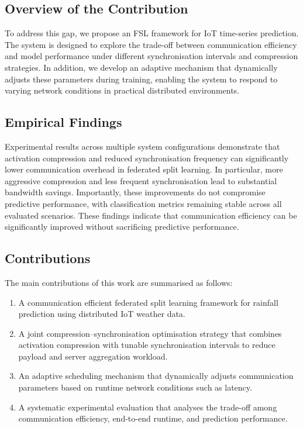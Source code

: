 \documentclass[conference]{IEEEtran}
\begin{document}
\subsection{Overview of the Contribution}
To address this gap, we propose an FSL framework for IoT time-series prediction. The system is designed to explore the trade-off between communication efficiency and model performance under different synchronisation intervals and compression strategies. In addition, we develop an adaptive mechanism that dynamically adjusts these parameters during training, enabling the system to respond to varying network conditions in practical distributed environments.


\subsection{Empirical Findings}

Experimental results across multiple system configurations demonstrate that activation compression and reduced synchronisation frequency can significantly lower communication overhead in federated split learning. In particular, more aggressive compression and less frequent synchronisation lead to substantial bandwidth savings. Importantly, these improvements do not compromise predictive performance, with classification metrics remaining stable across all evaluated scenarios. These findings indicate that communication efficiency can be significantly improved without sacrificing predictive performance.


\subsection{Contributions}
The main contributions of this work are summarised as follows:
\begin{enumerate}
    \item A communication efficient federated split learning framework for rainfall prediction using distributed IoT weather data.
    \item A joint compression--synchronisation optimisation strategy that combines activation compression with tunable synchronisation intervals to reduce payload and server aggregation workload.
    \item An adaptive scheduling mechanism that dynamically adjusts communication parameters based on runtime network conditions such as latency.
    \item A systematic experimental evaluation that analyses the trade-off among communication efficiency, end-to-end runtime, and prediction performance.
\end{enumerate}
\end{document}
